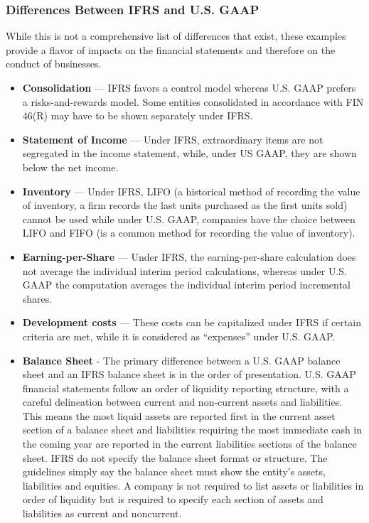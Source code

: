 \subsubsection {Differences Between IFRS and U.S. GAAP}
While this is not a comprehensive list of differences that exist, these examples provide a flavor of impacts on the financial statements and therefore on the conduct of businesses.
\begin{itemize}
	\item \textbf{Consolidation} — IFRS favors a control model whereas U.S. GAAP prefers a risks-and-rewards model. Some entities consolidated in accordance with FIN 46(R) may have to be shown separately under IFRS.
	\item \textbf{Statement of Income} — Under IFRS, extraordinary items are not segregated in the income statement, while, under US GAAP, they are shown below the net income.
	\item \textbf{Inventory} — Under IFRS, LIFO (a historical method of recording the value of inventory, a firm records the last units purchased as the first units sold) cannot be used while under U.S. GAAP, companies have the choice between LIFO and FIFO (is a common method for recording the value of inventory).
	\item \textbf{Earning-per-Share} — Under IFRS, the earning-per-share calculation does not average the individual interim period calculations, whereas under U.S. GAAP the computation averages the individual interim period incremental shares.
	\item \textbf{Development costs} — These costs can be capitalized under IFRS if certain criteria are met, while it is considered as “expenses” under U.S. GAAP.

	\item \textbf{Balance Sheet} - The primary difference between a U.S. GAAP balance sheet and an IFRS balance sheet is in the order of presentation. U.S. GAAP financial statements follow an order of liquidity reporting structure, with a careful delineation between current and non-current assets and liabilities. This means the most liquid assets are reported first in the current asset section of a balance sheet and liabilities requiring the most immediate cash in the coming year are reported in the current liabilities sections of the balance sheet. IFRS do not specify the balance sheet format or structure. The guidelines simply say the balance sheet must show the entity’s assets, liabilities and equities. A company is not required to list assets or liabilities in order of liquidity but is required to specify each section of assets and liabilities as current and noncurrent.
\end{itemize}

